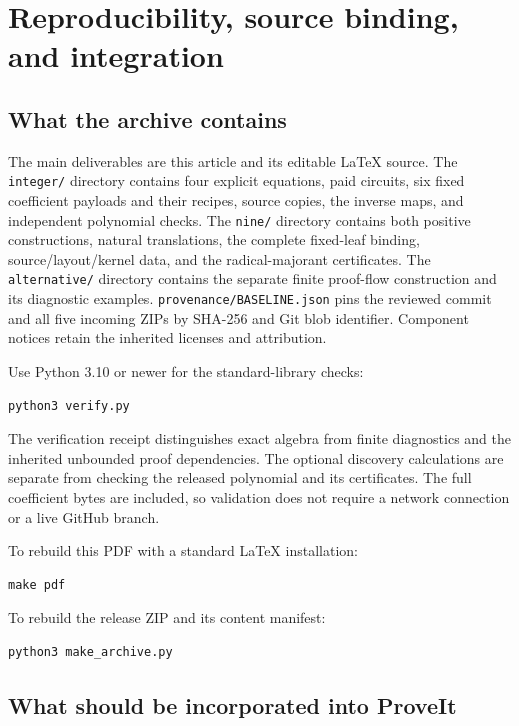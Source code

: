 \documentclass[11pt]{article}
\theoremstyle{definition}
\theoremstyle{remark}
\newcommand{\file}[1]{\nolinkurl{#1}}
\begin{document}




\section{Reproducibility, source binding, and integration}

\subsection{What the archive contains}

The main deliverables are this article and its editable LaTeX source.
The \file{integer/} directory contains four explicit equations, paid
circuits, six fixed coefficient payloads and their recipes, source copies,
the inverse maps, and independent polynomial checks. The \file{nine/}
directory contains both positive constructions, natural translations,
the complete fixed-leaf binding, source/layout/kernel data, and the
radical-majorant certificates. The \file{alternative/} directory contains
the separate finite proof-flow construction and its diagnostic examples.
\file{provenance/BASELINE.json} pins the reviewed commit and all five
incoming ZIPs by SHA-256 and Git blob identifier. Component notices retain
the inherited licenses and attribution.

Use Python 3.10 or newer for the standard-library checks:
\begin{lstlisting}
python3 verify.py
\end{lstlisting}
The verification receipt distinguishes exact algebra from finite
diagnostics and the inherited unbounded proof dependencies. The optional
discovery calculations are separate from checking the released polynomial
and its certificates. The full coefficient bytes are included, so validation
does not require a network connection or a live GitHub branch.

To rebuild this PDF with a standard LaTeX installation:
\begin{lstlisting}
make pdf
\end{lstlisting}
To rebuild the release ZIP and its content manifest:
\begin{lstlisting}
python3 make_archive.py
\end{lstlisting}

\subsection{What should be incorporated into ProveIt}
\end{document}

